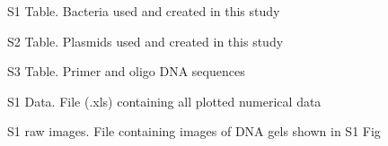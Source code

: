 S1 Table. Bacteria used and created in this study

S2 Table. Plasmids used and created in this study

S3 Table. Primer and oligo DNA sequences

S1 Data. File (.xls) containing all plotted numerical data

S1 raw images. File containing images of DNA gels shown in S1 Fig

%
